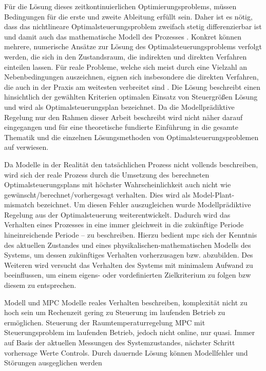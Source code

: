 Für die Lösung dieses zeitkontinuierlichen Optimierungsproblems, müssen Bedingungen für die erste und zweite Ableitung erfüllt sein. Daher ist es nötig, dass das nichtlineare Optimalsteuerungsproblem zweifach stetig differenzierbar ist und damit auch das mathematische Modell des Prozesses \cite[S.~21ff.]{di14}.
Konkret können mehrere, numerische Ansätze zur Lösung des Optimalsteuerungsproblems verfolgt werden, die sich in den Zustandsraum, die indirekten und direkten Verfahren einteilen lassen. Für reale Probleme, welche sich meist durch eine Vielzahl an Nebenbedingungen auszeichnen, eignen sich insbesondere die direkten Verfahren, die auch in der Praxis am weitesten verbreitet sind \cite[S.~63]{di14}. Die Lösung beschreibt einen hinsichtlich der gewählten Kriterien optimalen Einsatz von Steuergrößen Lösung und wird als Optimalsteuerungsplan bezeichnet.
Da die Modellprädiktive Regelung nur den Rahmen dieser Arbeit beschreibt wird nicht näher darauf eingegangen und für eine theoretische fundierte Einführung in die gesamte Thematik und die einzelnen Lösungsmethoden von Optimalsteuerungsproblemen auf \cite{di14} verwiesen.

Da Modelle in der Realität den tatsächlichen Prozess nicht vollends beschreiben, wird sich der reale Prozess durch die Umsetzung des berechneten Optimalsteuerungsplans mit höchster Wahrscheinlichkeit auch nicht wie gewünscht/berechnet/vorhergesagt verhalten. Dies wird als Model-Plant-mismatch bezeichnet. Um diesen Fehler auszugleichen wurde Modellprädiktive Regelung aus der Optimalsteuerung weiterentwickelt.
Dadurch wird das Verhalten eines Prozesses in eine immer gleichweit in die zukünftige Periode hineinreichende Periode -- zu beschreiben. Hierzu bedient \acrlong{mpc} sich der Kenntnis des aktuellen Zustandes und eines physikalischen-mathematischen Modells des Systems, um dessen zukünftiges Verhalten \Gun vorherzusagen \Gob bzw. abzubilden. Des Weiteren wird versucht das Verhalten des Systems mit minimalem Aufwand zu beeinflussen, um einem eigens- oder vordefinierten Zielkriterium zu folgen \acrlong{bzw} diesem zu entsprechen.
\cite[S.~71]{di14}

Modell und MPC
Modelle reales Verhalten beschreiben,  komplexität nicht zu hoch sein um Rechenzeit gering zu  Steuerung im laufenden Betrieb zu ermöglichen.
Steuerung der Raumtemperaturregelung MPC mit Steuerungsproblem im laufenden Betrieb, jedoch nicht online, nur quasi. Immer auf Basis der aktuellen Messungen des Systemzustandes, nächster Schritt vorhersage Werte Controls. Durch dauernde Lösung können Modellfehler und Störungen ausgeglichen werden

